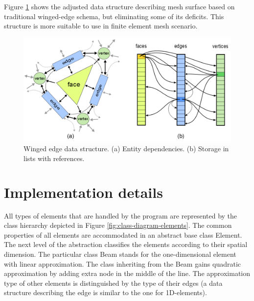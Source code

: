 Figure \ref{fig:winged-edge} shows the adjusted data structure describing mesh surface based on traditional winged-edge schema, but eliminating some of its deficits. This structure is more suitable to use in finite element mesh scenario.

\begin{figure}[H]
\centering
\includegraphics[width=\textwidth]{figures/chapter-mesh-visualization/figure1}
\decoRule
\caption[Winged edge data structure]{Winged edge data structure. (a) Entity dependencies. (b) Storage in lists with references.}
\label{fig:winged-edge}
\end{figure}



\section{Implementation details}
\label{sec:A-implementation}

All types of elements that are handled by the program are represented by the class hierarchy depicted in Figure \ref{fig:class-diagram-elements}. The common properties of all elements are accommodated in an abstract base class Element. The next level of the abstraction classifies the elements according to their spatial dimension. The particular class Beam stands for the one-dimensional element with linear approximation. The class inheriting from the Beam gains quadratic approximation by adding extra node in the middle of the line. The approximation type of other elements is distinguished by the type of their edges (a data structure describing the edge is similar to the one for 1D-elements).

